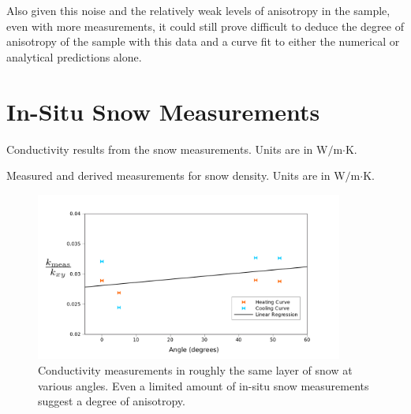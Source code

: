 Also given this noise and the relatively weak levels of anisotropy in the
sample, even with more measurements, it could still prove difficult to deduce
the degree of anisotropy of the sample with this data and a curve fit to either
the numerical or analytical predictions alone.

\section{In-Situ Snow Measurements}

\begin{table}[h]
\centering

\caption{Conductivity results from the snow measurements. Units are in W\(/\)m\(\cdot\)K.}
\label{tab:snow}
\end{table}

\begin{table}[h]
\centering

\caption{Measured and derived measurements for snow density. Units are in W\(/\)m\(\cdot\)K.}
\label{tab:density}
\end{table}

\begin{figure}[h]
\centering
\includegraphics[width=0.9\textwidth]{fig/snow_meas.png}
\caption{Conductivity measurements in roughly the same layer of snow at various 
angles. Even a limited amount of in-situ snow measurements suggest a degree of
anisotropy.}
\label{fig:snow_results}
\end{figure}

